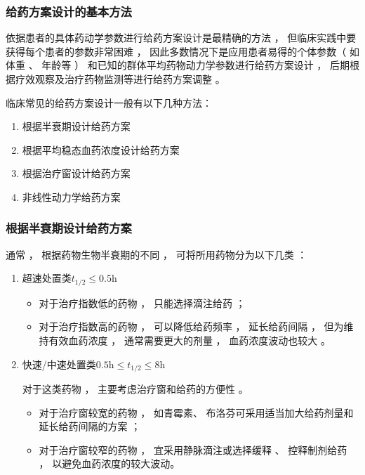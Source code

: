 \documentclass[dvipsnames, svgnames, x11names]{beamer}
\begin{document}
\begin{frame}
    \frametitle{给药方案设计的基本方法}
    依据患者的具体药动学参数进行给药方案设计是最精确的方法 ， 但临床实践中要获得每个患者的参数非常困难 ， 因此多数情况下是应用患者易得的个体参数（ 如体重 、 年龄等 ） 和已知的群体平均药物动力学参数进行给药方案设计 ， 后期根据疗效观察及治疗药物监测等进行给药方案调整 。
    
    临床常见的给药方案设计一般有以下几种方法：
    \begin{enumerate}
      \item 根据半衰期设计给药方案
      \item 根据平均稳态血药浓度设计给药方案
      \item 根据治疗窗设计给药方案
      \item 非线性动力学给药方案
    \end{enumerate}
\end{frame}


\begin{frame}
    \frametitle{根据半衰期设计给药方案}
    通常 ， 根据药物生物半衰期的不同 ， 可将所用药物分为以下几类 ：
    \begin{enumerate}
      \item 超速处置类$t_{1/2}\leqslant 0.5 \mathrm{h}$
            \begin{itemize}
              \item 对于治疗指数低的药物 ， 只能选择滴注给药 ； 
              \item 对于治疗指数高的药物 ， 可以降低给药频率 ， 延长给药间隔 ， 但为维持有效血药浓度 ， 通常需要更大的剂量 ， 血药浓度波动也较大 。
            \end{itemize}
      \item 快速/中速处置类$0.5 \mathrm{h} \leqslant t_{1/2}\leqslant 8 \mathrm{h}$
      
      对于这类药物 ， 主要考虑治疗窗和给药的方便性 。
            \begin{itemize}
                \item 对于治疗窗较宽的药物 ， 如青霉素、 布洛芬可采用适当加大给药剂量和延长给药间隔的方案 ；
                \item 对于治疗窗较窄的药物 ， 宜采用静脉滴注或选择缓释 、 控释制剂给药 ， 以避免血药浓度的较大波动。
            \end{itemize}
    \end{enumerate}
\end{frame}
\end{document}
